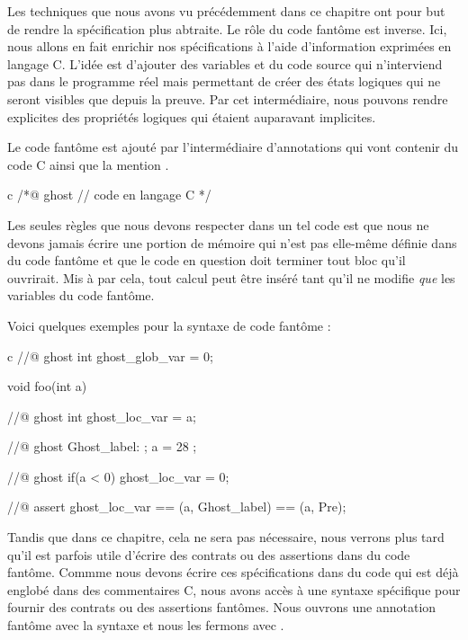Les techniques que nous avons vu précédemment dans ce chapitre ont pour but de
rendre la spécification plus abtraite. Le rôle du code fantôme est inverse. Ici,
nous allons en fait enrichir nos spécifications à l'aide d'information exprimées
en langage C. L'idée est d'ajouter des variables et du code source qui
n'interviend pas dans le programme réel mais permettant de créer des états
logiques qui ne seront visibles que depuis la preuve. Par cet intermédiaire,
nous pouvons rendre explicites des propriétés logiques qui étaient auparavant
implicites.




Le code fantôme est ajouté par l'intermédiaire d'annotations qui vont contenir
du code C ainsi que la mention .



\begin{CodeBlock}{c}
/*@
  ghost
  // code en langage C
*/
\end{CodeBlock}



Les seules règles que nous devons respecter dans un tel code est que nous ne
devons jamais écrire une portion de mémoire qui n'est pas elle-même définie dans
du code fantôme et que le code en question doit terminer tout bloc qu'il ouvrirait.
Mis à par cela, tout calcul peut être inséré tant qu’il ne modifie \textit{que} les variables
du code fantôme.



Voici quelques exemples pour la syntaxe de code fantôme :



\begin{CodeBlock}{c}
//@ ghost int ghost_glob_var = 0;

void foo(int a){
  //@ ghost int ghost_loc_var = a;

  //@ ghost Ghost_label: ;
  a = 28 ;

  //@ ghost if(a < 0){ ghost_loc_var = 0; }

  //@ assert ghost_loc_var == \at(a, Ghost_label) == \at(a, Pre);
}
\end{CodeBlock}


Tandis que dans ce chapitre, cela ne sera pas nécessaire, nous verrons plus tard
qu'il est parfois utile d'écrire des contrats ou des assertions dans du code
fantôme. Commme nous devons écrire ces spécifications dans du code qui est
déjà englobé dans des commentaires C, nous avons accès à une syntaxe spécifique
pour fournir des contrats ou des assertions fantômes. Nous ouvrons une annotation
fantôme avec la syntaxe  et nous les fermons avec .


